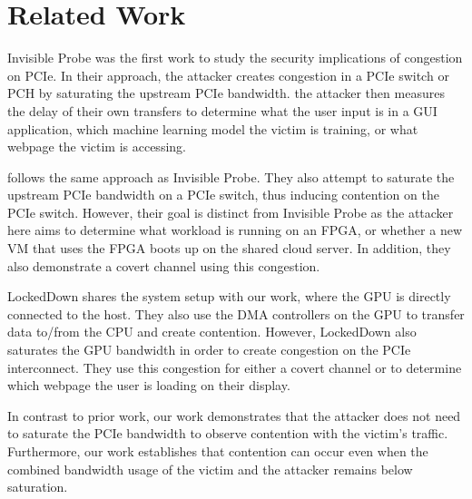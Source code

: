 \section{Related Work}
\label{sec:interconnect-sc-related-work}

Invisible Probe \cite{tan2021invisible} was the first work to study the security implications of congestion on PCIe.
In their approach, the attacker creates congestion in a PCIe switch or PCH by saturating the upstream PCIe bandwidth.
the attacker then measures the delay of their own transfers to determine what the user input is in a GUI application, which machine learning model the victim is training, or what webpage the victim is accessing.

\citet{giechaskiel2022cross} follows the same approach as Invisible Probe.
They also attempt to saturate the upstream PCIe bandwidth on a PCIe switch, thus inducing contention on the PCIe switch.
However, their goal is distinct from Invisible Probe as the attacker here aims to determine what workload is running on an FPGA, or whether a new VM that uses the FPGA boots up on the shared cloud server.
In addition, they also demonstrate a covert channel using this congestion.

LockedDown \cite{side2022lockeddown} shares the system setup with our work, where the GPU is directly connected to the host.
They also use the DMA controllers on the GPU to transfer data to/from the CPU and create contention.
However, LockedDown also saturates the GPU bandwidth in order to create congestion on the PCIe interconnect.
They use this congestion for either a covert channel or to determine which webpage the user is loading on their display.

In contrast to prior work, our work demonstrates that the attacker does not need to saturate the PCIe bandwidth to observe contention with the victim's traffic. 
Furthermore, our work establishes that contention can occur even when the combined bandwidth usage of the victim and the attacker remains below saturation.